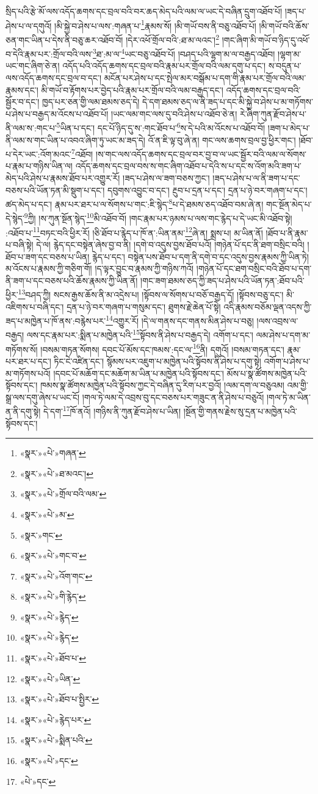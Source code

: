 སྲིད་པའི་རྩེ་མོ་ལས་འདོད་ཆགས་དང་བྲལ་བའི་བར་ཆད་མེད་པའི་ལམ་ལ་ཡང་དེ་བཞིན་དྲུག་འཐོབ་པོ། །ཟད་པ་ཤེས་པ་ལ་དགུའོ། །མི་སྐྱེ་བ་ཤེས་པ་ལས་:གཞན་པ་\footnote{«སྣར་»«པེ་»གཞན་}རྣམས་སོ། །མི་གཡོ་བས་ནི་བཅུ་འཐོབ་པོ། །མི་གཡོ་བའི་ཆོས་ཅན་གང་ཡིན་པ་དེས་ནི་བཅུ་ཆར་འཐོབ་བོ། །དེར་འཕོ་གྲོལ་བའི་:ཐ་མ་ལའང་།\footnote{«སྣར་»«པེ་»ཐ་མའང་།} །གང་ཞིག་མི་གཡོ་བ་ཉིད་དུ་འཕོ་བ་དེའི་རྣམ་པར་:གྲོལ་བའི་ལས་\footnote{«སྣར་»«པེ་»གྲོལ་བའི་ལམ་}ཐ་:མ་ལ་\footnote{«སྣར་»«པེ་»མ་}ཡང་བཅུ་འཐོབ་པོ། །བཤད་པའི་ལྷག་མ་ལ་བརྒྱད་འཐོབ། །ལྷག་མ་ཡང་གང་ཞིག་ཅེ་ན། འདོད་པའི་འདོད་ཆགས་དང་བྲལ་བའི་རྣམ་པར་གྲོལ་བའི་ལམ་དགུ་པ་དང་། ས་བདུན་པ་ལས་འདོད་ཆགས་དང་བྲལ་བ་དང་། མངོན་པར་ཤེས་པ་དང་སྤེལ་མར་བསྒོམ་པ་དག་གི་རྣམ་པར་གྲོལ་བའི་ལམ་རྣམས་དང་། མི་གཡོ་བ་རྟོགས་པར་བྱེད་པའི་རྣམ་པར་གྲོལ་བའི་ལམ་བརྒྱད་དང་། འདོད་ཆགས་དང་བྲལ་བའི་སྦྱོར་བ་དང་། ཁྱད་པར་ཅན་གྱི་ལམ་ཐམས་ཅད་དེ། དེ་དག་ཐམས་ཅད་ལ་ནི་ཟད་པ་དང་མི་སྐྱེ་བ་ཤེས་པ་མ་གཏོགས་པ་ཤེས་པ་བརྒྱད་མ་འོངས་པ་འཐོབ་པོ། །ཡང་ལམ་གང་ལས་དུ་བའི་ཤེས་པ་འཐོབ་ཅེ་ན། རེ་ཞིག་ཀུན་རྫོབ་ཤེས་པ་ནི་ལམ་ས་:གང་པ་\footnote{«སྣར་»གང་}ཡིན་པ་དང་། དང་པོ་ཉིད་དུ་ས་:གང་ཐོབ་པ་\footnote{«སྣར་»«པེ་»གང་བ་}ས་དེ་པའི་མ་འོངས་པ་འཐོབ་བོ། །ཟག་པ་མེད་པ་ནི་ལམ་ས་གང་ཡིན་པ་འབའ་ཞིག་ཏུ་ཡང་མ་ཟད་དེ། འོ་ན་ཇི་ལྟ་བུ་ཞེ་ན། གང་ལས་ཆགས་བྲལ་བྱ་ཕྱིར་གང་། །ཐོབ་པ་དེར་ཡང་:འོག་མའང་\footnote{«སྣར་»«པེ་»འོག་གང་}འཐོབ། །ས་གང་ལས་འདོད་ཆགས་དང་བྲལ་བར་བྱ་བ་ལ་ཡང་སྦྱོར་བའི་ལམ་ལ་སོགས་པ་རྣམ་པ་གཉིས་ཡིན་ལ། འདོད་ཆགས་དང་བྲལ་བས་ས་གང་ཞིག་འཐོབ་པ་དེའི་ས་པ་དང་ས་འོག་མའི་ཟག་པ་མེད་པའི་ཤེས་པ་རྣམས་ཐོབ་པར་འགྱུར་རོ། །ཟད་པ་ཤེས་ལ་ཟག་བཅས་ཀྱང་། །ཟད་པ་ཤེས་པ་ལ་ནི་ཟག་པ་དང་བཅས་པའི་ཡོན་ཏན་མི་སྡུག་པ་དང་། དབུགས་འབྱུང་བ་དང་། རྔུབ་པ་དྲན་པ་དང་། དྲན་པ་ཉེ་བར་གཞག་པ་དང་། ཚད་མེད་པ་དང་། རྣམ་པར་ཐར་པ་ལ་སོགས་པ་གང་:ཇི་སྙེད་\footnote{«སྣར་»«པེ་»གི་རྙེད་}པ་དེ་ཐམས་ཅད་འཐོབ་བམ་ཞེ་ན། གང་སྔོན་མེད་པ་དེ་སྙེད་\footnote{«སྣར་»«པེ་»རྙེད་}ཀྱི། །ས་ཀུན་སྔོན་སྙེད་\footnote{«སྣར་»«པེ་»རྙེད་}མི་འཐོབ་བོ། །གང་རྣམ་པར་ཉམས་པ་ལས་གང་རྙེད་པ་དེ་ཡང་མི་འཐོབ་སྟེ། :འཐོབ་པ་\footnote{«སྣར་»«པེ་»ཐོབ་པ་}བཏང་བའི་ཕྱིར་རོ། །ཅི་ཐོབ་པ་རྙེད་པ་ཁོ་ན་:ཡིན་ནམ་\footnote{«སྣར་»«པེ་»ཡིན་}ཞེ་ན། སྨྲས་པ། མ་ཡིན་ནོ། །ཐོབ་པ་ནི་རྣམ་པ་བཞི་སྟེ། དེ་ལ། རྙེད་དང་བསྟེན་ཞེས་བྱ་བ་ནི། །དགེ་བ་འདུས་བྱས་ཐོབ་པའོ། །གཉེན་པོ་དང་ནི་ཐག་བསྲིང་བའི། །ཐོབ་པ་ཟག་དང་བཅས་པ་ཡིན། རྙེད་པ་དང་། བསྟེན་པས་ཐོབ་པ་དག་ནི་དགེ་བ་དང་འདུས་བྱས་རྣམས་ཀྱི་ཡིན་ཏེ། མ་འོངས་པ་རྣམས་ཀྱི་གཅིག་གོ། །ད་ལྟར་བྱུང་བ་རྣམས་ཀྱི་གཉིས་ཀའོ། །གཉེན་པོ་དང་ཐག་བསྲིང་བའི་ཐོབ་པ་དག་ནི་ཟག་པ་དང་བཅས་པའི་ཆོས་རྣམས་ཀྱི་ཡིན་ནོ། །གང་ཟག་ཐམས་ཅད་ཀྱི་ཟད་པ་ཤེས་པའི་ཡོན་ཏན་:ཐོབ་པའི་ཕྱིར་\footnote{«སྣར་»«པེ་»ཐོབ་པ་སྤྱིར་}བཤད་ཀྱི། སངས་རྒྱས་ཆོས་ནི་མ་འདྲེས་པ། །སྟོབས་ལ་སོགས་པ་བཅོ་བརྒྱད་དོ། །སྟོབས་བཅུ་དང་། མི་འཇིགས་པ་བཞི་དང་། དྲན་པ་ཉེ་བར་གཞག་པ་གསུམ་དང་། ཐུགས་རྗེ་ཆེན་པོ་སྟེ། འདི་རྣམས་བཅོམ་ལྡན་འདས་ཀྱི་ཟད་པ་མཁྱེན་པ་ཁོ་ནས་:བརྙེས་པར་\footnote{«སྣར་»«པེ་»རྙེད་པར་}འགྱུར་རོ། །དེ་ལ་གནས་དང་གནས་མིན་ཤེས་པ་བཅུ། །ལས་འབྲས་ལ་བརྒྱད། ལས་དང་རྣམ་པར་:སྨིན་པ་མཁྱེན་པའི་\footnote{«སྣར་»«པེ་»སྨིན་པའི་}སྟོབས་ནི་ཤེས་པ་བརྒྱད་དེ། འགོག་པ་དང་། ལམ་ཤེས་པ་དག་མ་གཏོགས་སོ། །བསམ་གཏན་སོགས། དབང་པོ་མོས་དང་ཁམས་:དང་ལ་\footnote{«སྣར་»«པེ་»དང་}ནི། དགུའོ། །བསམ་གཏན་དང་། རྣམ་པར་ཐར་པ་དང་། ཏིང་ངེ་འཛིན་དང་། སྙོམས་པར་འཇུག་པ་མཁྱེན་པའི་སྟོབས་ནི་ཤེས་པ་དགུ་སྟེ། འགོག་པ་ཤེས་པ་མ་གཏོགས་པའོ། །དབང་པོ་མཆོག་དང་མཆོག་མ་ཡིན་པ་མཁྱེན་པའི་སྟོབས་དང་། མོས་པ་སྣ་ཚོགས་མཁྱེན་པའི་སྟོབས་དང་། ཁམས་སྣ་ཚོགས་མཁྱེན་པའི་སྟོབས་ཀྱང་དེ་བཞིན་དུ་རིག་པར་བྱའོ། །ལམ་དག་ལ་བཅུའམ། འམ་གྱི་སྒྲ་ལས་དགུ་ཞེས་པ་ཡང་ངོ། །གལ་ཏེ་ལམ་དེ་འབྲས་བུ་དང་བཅས་པར་གཟུང་ན་ནི་ཤེས་པ་བཅུའོ། །གལ་ཏེ་མ་ཡིན་ན་ནི་དགུ་སྟེ། དེ་དག་\footnote{«པེ་»དང་}ཁོ་ནའོ། །གཉིས་ནི་ཀུན་རྫོབ་ཤེས་པ་ཡིན། །སྔོན་གྱི་གནས་རྗེས་སུ་དྲན་པ་མཁྱེན་པའི་སྟོབས་དང་། 